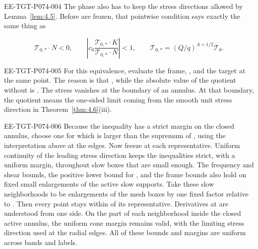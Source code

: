 \begin{EESegment}{EE-TGT-P074-004}
The phase also has to keep the stress directions allowed by Lemma~\ref{lem:4.5}. Before  are frozen, that pointwise condition says exactly the same thing as
\end{EESegment}
\begin{equation}
\mathcal T_{0,*}\cdot N<0,\qquad
\left|c_0\frac{\mathcal T_{0,*}\cdot K}{\mathcal T_{0,*}\cdot N}\right|<1,\qquad
\mathcal T_{0,*}=(Q/q)^{A+1/2}\mathcal T_0.
\tag{7.1}\label{eq:7.1}
\end{equation}
\begin{EESegment}{EE-TGT-P074-005}
For this equivalence, evaluate the frame, , and the target at the same point. The reason is that , while the absolute value of the quotient without  is . The stress vanishes at the boundary of an annulus. At that boundary, the quotient means the one-sided limit coming from the smooth unit stress direction in Theorem~\ref{thm:4.6}(iii).
\end{EESegment}

\begin{EESegment}{EE-TGT-P074-006}
Because the inequality has a strict margin on the closed annulus, choose one  for which  is larger than the supremum of , using the interpretation above at the edges. Now freeze  at each representative. Uniform continuity of the leading stress direction keeps the inequalities strict, with a uniform margin, throughout slow boxes that are small enough. The frequency and shear bounds, the positive lower bound for , and the frame bounds also hold on fixed small enlargements of the active slow supports. Take these slow neighborhoods to be enlargements of the mesh boxes by one fixed factor relative to . Then every point stays within  of its representative. Derivatives at  are understood from one side. On the part of each neighborhood inside the closed active annulus, the uniform cone margin remains valid, with the limiting stress direction used at the radial edges. All of these bounds and margins are uniform across bands and labels.
\end{EESegment}

